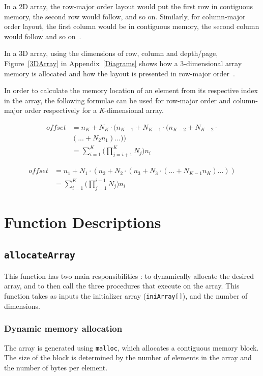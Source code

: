 \documentclass[10pt, conference]{IEEEtran}
\begin{document}
In a 2D array, the row-major order layout would put the first row in contiguous memory, the second row would follow, and so on. Similarly, for column-major order layout, the first column would be in contiguous memory, the second column would follow and so on~\cite{Eli}.

In a 3D array, using the dimensions of row, column and depth/page, Figure~\ref{3DArray} in Appendix~\ref{Diagrams} shows how a 3-dimensional array memory is allocated and how the layout is presented in row-major order~\cite{Eli}.

In order to calculate the memory location of an element from its respective index in the array, the following formulae can be used for row-major order and column-major order respectively for a \emph{K}-dimensional array.


\begin{equation}
\label{eqn1}
\begin{split}
offset &= n_K + N_K \cdot (n_{K-1} +N_{K-1} \cdot (n_{K-2} +N_{K-2} \cdot\\& (...+N_2n_1)...) )\\
&= \sum_{i=1}^{K} \bigg(\prod_{j=i+1}^{K} N_j \bigg) n_i
\end{split}
\end{equation}

\begin{equation}
\label{eqn2}
\begin{split}
offset &= n_1 + N_1 \cdot (n_2 +N_2 \cdot (n_3 +N_3 \cdot (...+N_{K-1}n_K)...) )\\
	&= \sum_{i=1}^{K} \bigg(\prod_{j=1}^{i-1} N_j \bigg) n_i
\end{split}
\end{equation}

\section{Function Descriptions}
\label{Program Description}
\subsection{\texttt{allocateArray}}
This function has two main responsibilities : to dynamically allocate the desired array, and to then call the three procedures that execute on the array.
This function takes as inputs the initializer array (\texttt{iniArray[]}), and the number of dimensions.

\subsubsection{Dynamic memory allocation}
The array is generated using \texttt{malloc}, which allocates a contiguous memory block. The size of the block is determined by the number of elements in the array and the number of bytes per element.
\end{document}

